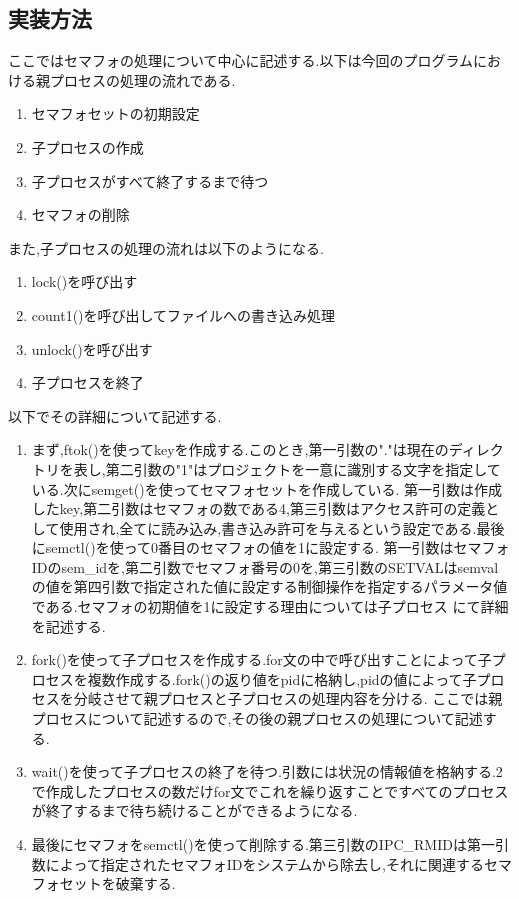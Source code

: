 \documentclass[dvipdfmx]{jarticle}
\begin{document}
\subsection{実装方法}
ここではセマフォの処理について中心に記述する.以下は今回のプログラムにおける親プロセスの処理の流れである.
\begin{enumerate}
    \item セマフォセットの初期設定
    \item 子プロセスの作成
    \item 子プロセスがすべて終了するまで待つ
    \item セマフォの削除
\end{enumerate}
また,子プロセスの処理の流れは以下のようになる.
\begin{enumerate}
    \item lock()を呼び出す
    \item count1()を呼び出してファイルへの書き込み処理
    \item unlock()を呼び出す
    \item 子プロセスを終了
\end{enumerate}
以下でその詳細について記述する.
\begin{enumerate}
    \item まず,ftok()を使ってkeyを作成する.このとき,第一引数の"."は現在のディレクトリを表し,第二引数の"1"はプロジェクトを一意に識別する文字を指定している.\cite{1}次にsemget()を使ってセマフォセットを作成している.
    第一引数は作成したkey,第二引数はセマフォの数である4,第三引数はアクセス許可の定義として使用され,全てに読み込み,書き込み許可を与えるという設定である.\cite{2}最後にsemctl()を使って0番目のセマフォの値を1に設定する.
    第一引数はセマフォIDのsem\_idを,第二引数でセマフォ番号の0を,第三引数のSETVALはsemvalの値を第四引数で指定された値に設定する制御操作を指定するパラメータ値である.セマフォの初期値を1に設定する理由については子プロセス
    にて詳細を記述する.
    \item fork()を使って子プロセスを作成する.for文の中で呼び出すことによって子プロセスを複数作成する.fork()の返り値をpidに格納し,pidの値によって子プロセスを分岐させて親プロセスと子プロセスの処理内容を分ける.
    ここでは親プロセスについて記述するので,その後の親プロセスの処理について記述する.
    \item wait()を使って子プロセスの終了を待つ.引数には状況の情報値を格納する.2で作成したプロセスの数だけfor文でこれを繰り返すことですべてのプロセスが終了するまで待ち続けることができるようになる.\cite{3}
    \item 最後にセマフォをsemctl()を使って削除する.第三引数のIPC\_RMIDは第一引数によって指定されたセマフォIDをシステムから除去し,それに関連するセマフォセットを破棄する.\cite{2}
\end{enumerate}
\end{document}
